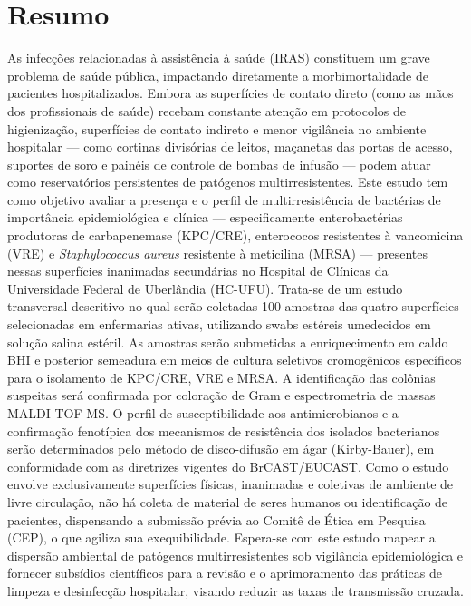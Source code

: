 \documentclass[12pt,a4paper]{article}
\begin{document}
\section{Resumo}
\noindent As infecções relacionadas à assistência à saúde (IRAS) constituem um grave problema de saúde pública, impactando diretamente a morbimortalidade de pacientes hospitalizados. Embora as superfícies de contato direto (como as mãos dos profissionais de saúde) recebam constante atenção em protocolos de higienização, superfícies de contato indireto e menor vigilância no ambiente hospitalar --- como cortinas divisórias de leitos, maçanetas das portas de acesso, suportes de soro e painéis de controle de bombas de infusão --- podem atuar como reservatórios persistentes de patógenos multirresistentes. Este estudo tem como objetivo avaliar a presença e o perfil de multirresistência de bactérias de importância epidemiológica e clínica --- especificamente enterobactérias produtoras de carbapenemase (KPC/CRE), enterococos resistentes à vancomicina (VRE) e \textit{Staphylococcus aureus} resistente à meticilina (MRSA) --- presentes nessas superfícies inanimadas secundárias no Hospital de Clínicas da Universidade Federal de Uberlândia (HC-UFU).
Trata-se de um estudo transversal descritivo no qual serão coletadas 100 amostras das quatro superfícies selecionadas em enfermarias ativas, utilizando swabs estéreis umedecidos em solução salina estéril. As amostras serão submetidas a enriquecimento em caldo BHI e posterior semeadura em meios de cultura seletivos cromogênicos específicos para o isolamento de KPC/CRE, VRE e MRSA. A identificação das colônias suspeitas será confirmada por coloração de Gram e espectrometria de massas MALDI-TOF MS. O perfil de susceptibilidade aos antimicrobianos e a confirmação fenotípica dos mecanismos de resistência dos isolados bacterianos serão determinados pelo método de disco-difusão em ágar (Kirby-Bauer), em conformidade com as diretrizes vigentes do BrCAST/EUCAST. Como o estudo envolve exclusivamente superfícies físicas, inanimadas e coletivas de ambiente de livre circulação, não há coleta de material de seres humanos ou identificação de pacientes, dispensando a submissão prévia ao Comitê de Ética em Pesquisa (CEP), o que agiliza sua exequibilidade. Espera-se com este estudo mapear a dispersão ambiental de patógenos multirresistentes sob vigilância epidemiológica e fornecer subsídios científicos para a revisão e o aprimoramento das práticas de limpeza e desinfecção hospitalar, visando reduzir as taxas de transmissão cruzada.
\end{document}
